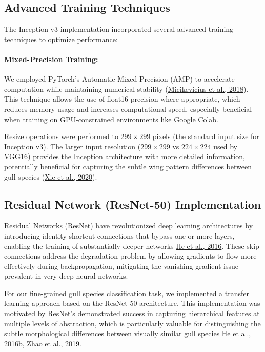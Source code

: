 \documentclass[a4paper,12pt]{article}
\begin{document}
\subsection*{Advanced Training Techniques}
The Inception v3 implementation incorporated several advanced training techniques to optimize performance:

\paragraph*{Mixed-Precision Training:} We employed PyTorch’s Automatic Mixed Precision (AMP) to accelerate computation while maintaining numerical stability (\href{https://arxiv.org/abs/1710.03740}{Micikevicius et al., 2018}). This technique allows the use of float16 precision where appropriate, which reduces memory usage and increases computational speed, especially beneficial when training on GPU-constrained environments like Google Colab.


Resize operations were performed to $299\times299$ pixels (the standard input size for Inception v3). The larger input resolution ($299\times299$ vs $224\times224$ used by VGG16) provides the Inception architecture with more detailed information, potentially beneficial for capturing the subtle wing pattern differences between gull species (\href{https://arxiv.org/abs/1911.0907}{Xie et al., 2020}).

\subsection{Residual Network (ResNet-50) Implementation}

Residual Networks (ResNet) have revolutionized deep learning architectures by introducing identity shortcut connections that bypass one or more layers, enabling the training of substantially deeper networks {\href{https://arxiv.org/abs/1512.03385}{He et al., 2016}}. These skip connections address the degradation problem by allowing gradients to flow more effectively during backpropagation, mitigating the vanishing gradient issue prevalent in very deep neural networks.

For our fine-grained gull species classification task, we implemented a transfer learning approach based on the ResNet-50 architecture. This implementation was motivated by ResNet's demonstrated success in capturing hierarchical features at multiple levels of abstraction, which is particularly valuable for distinguishing the subtle morphological differences between visually similar gull species {\href{https://arxiv.org/abs/1603.05027}{He et al., 2016b}, \href{https://ieeexplore.ieee.org/document/8658831}{Zhao et al., 2019}}.
\end{document}
